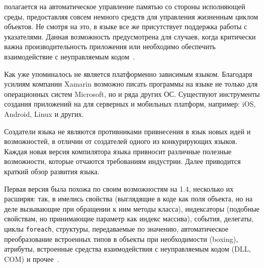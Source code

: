 \csharp{} полагается на автоматическое управление памятью со стороны исполняющей среды, предоставляя совсем немного средств для управления жизненным циклом объектов.
Не смотря на это, в языке все же присутствует поддержка работы с указателями.
Данная возможность предусмотрена для случаев, когда критически важна производительность приложения или необходимо обеспечить взаимодействие с неуправляемым кодом~\cite{albahari_2012_en}.

Как уже упоминалось \csharp{} не является платформенно зависимым языком.
Благодаря усилиям компании Xamarin возможно писать программы на языке \csharp{} не только для операционных систем Microsoft, но и ряда других ОС.
Существуют инструменты создания приложений на \csharp{} для серверных и мобильных платформ, например: iOS, Android, Linux и других.

Создатели языка \csharp{} не являются противниками привнесения в язык новых идей и возможностей, в отличии от создателей одного из конкурирующих языков.
Каждая новая версия компилятора языка привносит различные полезные возможности, которые отчаются требованиям индустрии.
Далее приводится краткий обзор развития языка.

Первая версия \csharp{} была похожа по своим возможностям на \java{} 1.4, несколько их расширяя: так, в \csharp{} имелись свойства (выглядящие в коде как поля объекта, но на деле вызывающие при обращении к ним методы класса), индексаторы (подобные свойствам, но принимающие параметр как индекс массива), события, делегаты, циклы \lstinline!foreach!, структуры, передаваемые по значению, автоматическое преобразование встроенных типов в объекты при необходимости (boxing), атрибуты, встроенные средства взаимодействия с неуправляемым кодом (DLL, COM) и прочее~\cite{csharp_wiki_2013_ru}.

